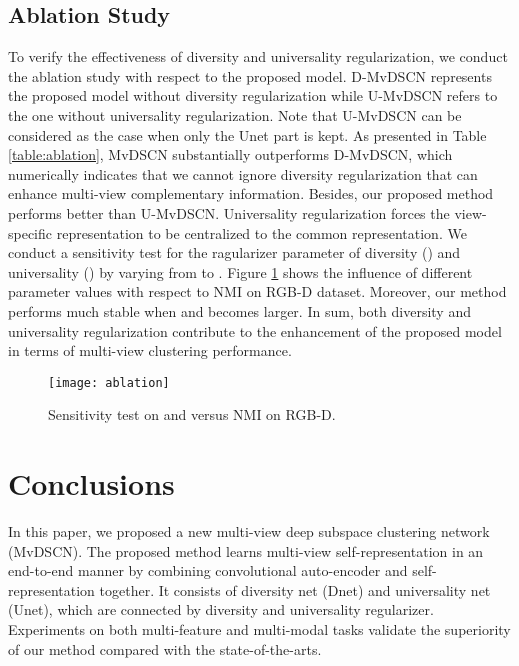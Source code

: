 \documentclass[journal]{IEEEtran}
\begin{document}
\subsection{Ablation Study}
To verify the effectiveness of diversity and universality regularization, we conduct the ablation study with respect to the proposed model.
D-MvDSCN represents the proposed model without diversity regularization while U-MvDSCN refers to the one without universality regularization.
Note that U-MvDSCN can be considered as the case when only the Unet part is kept. As presented in Table \ref{table:ablation}, MvDSCN substantially outperforms D-MvDSCN, which numerically indicates that we cannot ignore diversity regularization that can enhance multi-view complementary information. Besides, our proposed method performs better than U-MvDSCN.
Universality regularization forces the view-specific representation to be centralized to the common representation.
We conduct a sensitivity test for the ragularizer parameter of diversity () and universality () by varying from  to .
Figure \ref{fig:ablation} shows the influence of different parameter values with respect to NMI on RGB-D dataset.
Moreover, our method performs much stable when  and  becomes larger.
In sum, both diversity and universality regularization contribute to the enhancement of the proposed model in terms of multi-view clustering performance.

\begin{figure}[!htbp]
	\centering
	\texttt{[image: ablation]}
	\caption{Sensitivity test on  and  versus NMI on RGB-D.}
	\label{fig:ablation}
\end{figure}

\section{Conclusions}
\label{s5}
In this paper, we proposed a new multi-view deep subspace clustering network (MvDSCN).
The proposed method learns multi-view self-representation in an end-to-end manner by combining convolutional auto-encoder and self-representation together.
It consists of diversity net (Dnet) and universality net (Unet), which are connected by diversity and universality regularizer.
Experiments on both multi-feature and multi-modal tasks validate the superiority of our method compared with the state-of-the-arts.



\end{document}
